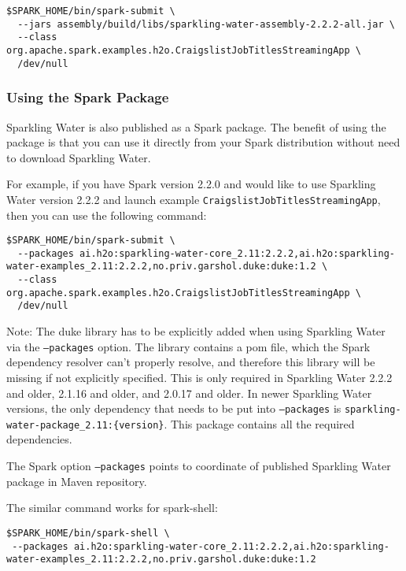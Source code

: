 \pagebreak
\begin{lstlisting}[style=Bash]
$SPARK_HOME/bin/spark-submit \
  --jars assembly/build/libs/sparkling-water-assembly-2.2.2-all.jar \
  --class org.apache.spark.examples.h2o.CraigslistJobTitlesStreamingApp \
  /dev/null
\end{lstlisting}

\subsubsection{Using the Spark Package}

Sparkling Water is also published as a Spark package. The benefit of using the package is that you can use it directly from your Spark distribution without need to download Sparkling Water.

For example, if you have Spark version 2.2.0 and would like to use Sparkling Water version 2.2.2 and launch example \texttt{CraigslistJobTitlesStreamingApp}, then you can use the following command:

\begin{lstlisting}[style=Bash]
$SPARK_HOME/bin/spark-submit \
  --packages ai.h2o:sparkling-water-core_2.11:2.2.2,ai.h2o:sparkling-water-examples_2.11:2.2.2,no.priv.garshol.duke:duke:1.2 \
  --class org.apache.spark.examples.h2o.CraigslistJobTitlesStreamingApp \
  /dev/null
\end{lstlisting}

Note: The duke library has to be explicitly added when using Sparkling Water via the \texttt{--packages} option. The library
contains a pom file, which the Spark dependency resolver can't properly resolve, and therefore this library will be missing if not explicitly
specified. This is only required in Sparkling Water 2.2.2 and older, 2.1.16 and older, and 2.0.17 and older. In newer Sparkling Water
versions, the only dependency that needs to be put into \texttt{--packages} is \texttt{sparkling-water-package\_2.11:\{version\}}.
This package contains all the required dependencies.


The Spark option \texttt{--packages} points to coordinate of published Sparkling Water package in Maven repository.

\newpage
The similar command works for spark-shell:

\begin{lstlisting}[style=Bash]
$SPARK_HOME/bin/spark-shell \
 --packages ai.h2o:sparkling-water-core_2.11:2.2.2,ai.h2o:sparkling-water-examples_2.11:2.2.2,no.priv.garshol.duke:duke:1.2
\end{lstlisting}

